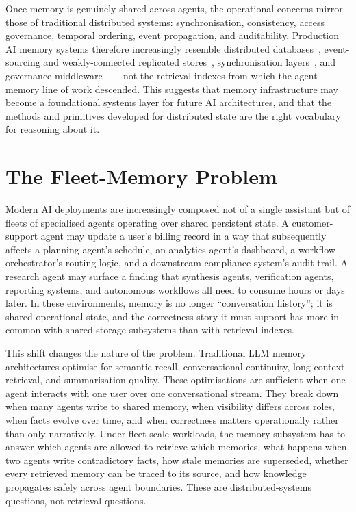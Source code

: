 \documentclass[10pt,twocolumn,letterpaper]{article}
\begin{document}
Once memory is genuinely shared across agents, the operational concerns mirror those of traditional distributed systems: synchronisation, consistency, access governance, temporal ordering, event propagation, and auditability. Production AI memory systems therefore increasingly resemble distributed databases~\citep{dynamo2007, spanner2013}, event-sourcing and weakly-connected replicated stores~\citep{bayou1995, crdt2011}, synchronisation layers~\citep{lamport1978}, and governance middleware~\citep{rbac1996, nist_attribute_based} --- not the retrieval indexes from which the agent-memory line of work descended. This suggests that memory infrastructure may become a foundational systems layer for future AI architectures, and that the methods and primitives developed for distributed state are the right vocabulary for reasoning about it.

\section{The Fleet-Memory Problem}
\label{sec:problem}

Modern AI deployments are increasingly composed not of a single assistant but of fleets of specialised agents operating over shared persistent state. A customer-support agent may update a user's billing record in a way that subsequently affects a planning agent's schedule, an analytics agent's dashboard, a workflow orchestrator's routing logic, and a downstream compliance system's audit trail. A research agent may surface a finding that synthesis agents, verification agents, reporting systems, and autonomous workflows all need to consume hours or days later. In these environments, memory is no longer ``conversation history''; it is shared operational state, and the correctness story it must support has more in common with shared-storage subsystems than with retrieval indexes.

This shift changes the nature of the problem. Traditional LLM memory architectures optimise for semantic recall, conversational continuity, long-context retrieval, and summarisation quality. These optimisations are sufficient when one agent interacts with one user over one conversational stream. They break down when many agents write to shared memory, when visibility differs across roles, when facts evolve over time, and when correctness matters operationally rather than only narratively. Under fleet-scale workloads, the memory subsystem has to answer which agents are allowed to retrieve which memories, what happens when two agents write contradictory facts, how stale memories are superseded, whether every retrieved memory can be traced to its source, and how knowledge propagates safely across agent boundaries. These are distributed-systems questions, not retrieval questions.
\end{document}
